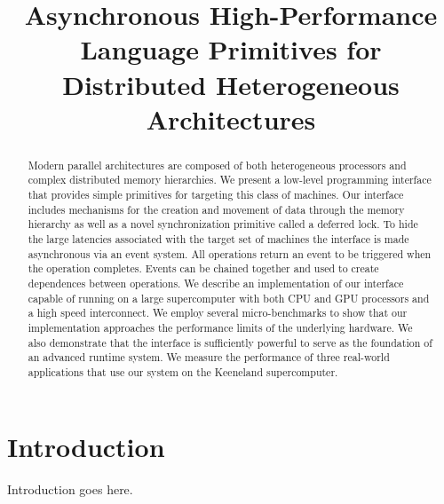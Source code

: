 \documentclass[preprint]{sig-alternate}
\begin{document}
\title{Asynchronous High-Performance Language Primitives for Distributed Heterogeneous Architectures}
\author{}
\maketitle

\begin{abstract}
Modern parallel architectures are composed of both heterogeneous processors
and complex distributed memory hierarchies.  We present a low-level programming
interface that provides simple primitives for targeting this class of
machines.  Our interface includes mechanisms for the creation and movement
of data through the memory hierarchy as well as a novel synchronization primitive 
called a deferred lock.  To hide the large latencies associated with the target
set of machines the interface is made asynchronous via an event system.  All
operations return an event to be triggered when the operation completes.  Events
can be chained together and used to create dependences between operations.
We describe an implementation of our interface capable of running on
a large supercomputer with both CPU and GPU processors and a high speed interconnect.
We employ several micro-benchmarks to show that our implementation approaches
the performance limits of the underlying hardware.
We also demonstrate that the interface is sufficiently powerful to serve as the foundation 
of an advanced runtime system.  We measure the performance of three real-world applications
that use our system on the Keeneland supercomputer.
\end{abstract}

\section{Introduction}
\label{sect:intro}
Introduction goes here\cite{Keeneland}.





{
\small

}
\end{document}

